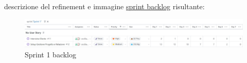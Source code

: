 descrizione del refinement e immagine \href{https://github.com/orgs/ISIQuiz/projects/3/}{sprint backlog} risultante:

\begin{figure}[H]
    \centering
    \includegraphics[width=\textwidth]{process/Img/Sprint1BL.jpg}
    \caption{Sprint 1 backlog}
    \label{fig:Sprint1}
\end{figure}
